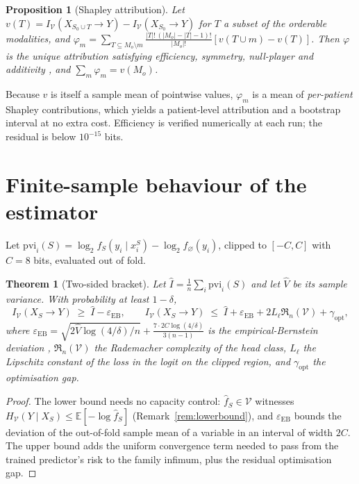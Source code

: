 \documentclass[11pt]{article}
\newtheorem{theorem}{Theorem}
\newtheorem{proposition}{Proposition}
\theoremstyle{definition}
\theoremstyle{remark}
\newcommand{\Vc}{\mathcal{V}}
\newcommand{\IV}{I_{\Vc}}
\newcommand{\HV}{H_{\Vc}}
\newcommand{\pvi}{\mathrm{pvi}}
\newcommand{\E}{\mathbb{E}}
\begin{document}
\begin{proposition}[Shapley attribution]
Let $v(T)=\IV(X_{S_0\cup T}\to Y)-\IV(X_{S_0}\to Y)$ for $T$ a subset of the
orderable modalities, and
$\varphi_m=\sum_{T\subseteq M_o\setminus m}\frac{|T|!\,(|M_o|-|T|-1)!}{|M_o|!}
[v(T\cup m)-v(T)]$. Then $\varphi$ is the unique attribution satisfying
efficiency, symmetry, null-player and additivity \citep{shapley1953value}, and
$\sum_m\varphi_m=v(M_o)$.
\end{proposition}

Because $v$ is itself a sample mean of pointwise values, $\varphi_m$ is a mean of
\emph{per-patient} Shapley contributions, which yields a patient-level
attribution and a bootstrap interval at no extra cost. Efficiency is verified
numerically at each run; the residual is below $10^{-15}$ bits.

\section{Finite-sample behaviour of the estimator}
\label{sec:s-finite}
\label{sec:finite}

Let $\pvi_i(S)=\log_2 f_S(y_i\mid x_i^S)-\log_2 f_\varnothing(y_i)$, clipped to
$[-C,C]$ with $C=8$ bits, evaluated out of fold.

\begin{theorem}[Two-sided bracket]
\label{thm:s-bracket}
Let $\hat I=\frac1n\sum_i\pvi_i(S)$ and let $\hat V$ be its sample variance.
With probability at least $1-\delta$,
\[
\IV(X_S\to Y)\;\ge\;\hat I-\varepsilon_{\mathrm{EB}},\qquad
\IV(X_S\to Y)\;\le\;\hat I+\varepsilon_{\mathrm{EB}}+2L_\ell\mathfrak R_n(\Vc)+\gamma_{\mathrm{opt}},
\]
where
$\varepsilon_{\mathrm{EB}}=\sqrt{2\hat V\log(4/\delta)/n}+\tfrac{7\cdot 2C\log(4/\delta)}{3(n-1)}$
is the empirical-Bernstein deviation \citep{maurer2009empirical},
$\mathfrak R_n(\Vc)$ the Rademacher complexity of the head class, $L_\ell$ the
Lipschitz constant of the loss in the logit on the clipped region, and
$\gamma_{\mathrm{opt}}$ the optimisation gap.
\end{theorem}

\begin{proof}
The lower bound needs no capacity control: $\hat f_S\in\Vc$ witnesses
$\HV(Y\mid X_S)\le\E[-\log \hat f_S]$ (Remark~\ref{rem:lowerbound}), and
$\varepsilon_{\mathrm{EB}}$ bounds the deviation of the out-of-fold sample mean of
a variable in an interval of width $2C$. The upper bound adds the uniform
convergence term needed to pass from the trained predictor's risk to the family
infimum, plus the residual optimisation gap.
\end{proof}
\end{document}
